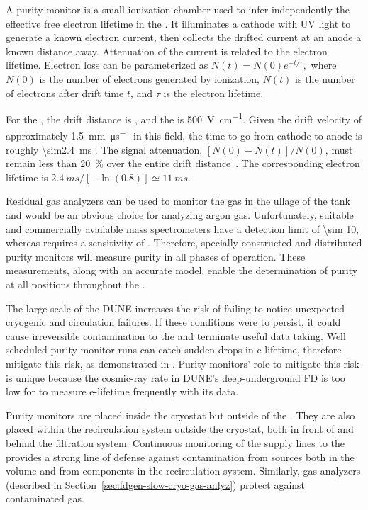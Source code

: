 A purity monitor is a small ionization chamber used to infer independently  the effective free electron lifetime in the \lartpc.  
It illuminates a cathode with UV light to generate a known electron current, then collects the drifted current at an anode a known distance away.  Attenuation of the current is related to the electron lifetime.
Electron loss can be parameterized as
%
\(N(t) = N(0)e^{-t/\tau},\)
%
where $N(0)$ is the number of electrons generated by ionization, $N(t)$ is the number of electrons after drift time $t$, and $\tau$ is the electron lifetime. 


For the , the drift distance is \spmaxdrift, and the \efield is \SI{500}{\volt\per\centi\meter}. Given the drift velocity of approximately \SI{1.5}{\milli\meter\per\micro\second} in this field, the time to go from cathode to anode is roughly \SI{\sim2.4}{\milli\second} \cite{Walkowiak:2000wf}.
The   signal attenuation, \([N(0)-N(t)]/N(0)\), must remain %
less than \SI{20}{\percent} over the entire drift distance~\cite{bib:docdb3384}.  %
 The corresponding electron lifetime is $\SI{2.4}{ms}/[-\ln(0.8)] \simeq \SI{11}{ms}$.


Residual gas analyzers can be used to monitor the gas in the ullage of the tank and would be an obvious choice for analyzing argon gas. 
Unfortunately, suitable and commercially available mass
spectrometers have a detection limit of \SI{\sim 10}{},
whereas  requires a sensitivity of . Therefore,
specially constructed and distributed purity monitors will measure  purity in all %
phases of operation. %
These measurements,
along with an accurate  model, enable the
determination of purity at all positions throughout the .

The large scale of the DUNE  increases the risk of failing to notice unexpected cryogenic and circulation failures. If these conditions were to persist, it could cause irreversible contamination to the  and terminate useful data taking.  Well scheduled purity monitor runs can catch sudden drops in e-lifetime, therefore mitigate this risk, as demonstrated in . Purity monitors' role to mitigate this risk is unique because the cosmic-ray rate in DUNE's deep-underground FD is too low for  to measure e-lifetime frequently with its data. 


Purity monitors are placed inside the cryostat but outside of the %
. They are also placed  within the recirculation system outside the cryostat, both in front of and behind the filtration system. %
Continuous monitoring of  the  supply lines to the  provides a strong line of defense against %
contamination from sources both in the  volume and from components in the recirculation system. 
Similarly, gas analyzers (described in Section~\ref{sec:fdgen-slow-cryo-gas-anlyz}) %
protect against contaminated gas.  

